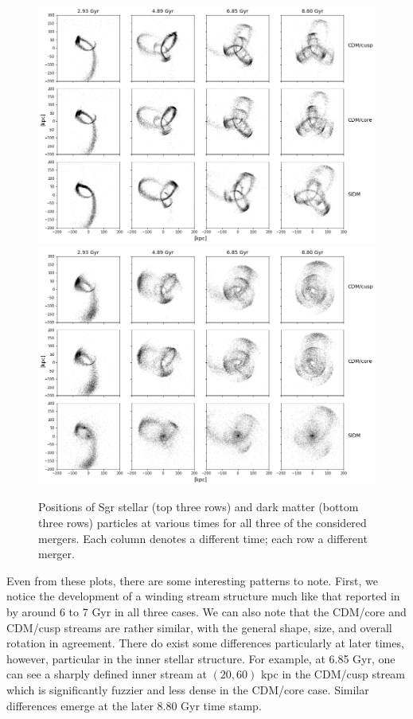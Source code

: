\begin{figure}
    \centering
    \includegraphics[width=0.9\linewidth]{figs/stars_bw.png}
    \includegraphics[width=0.9\linewidth]{figs/darks_bw.png}
    \caption{%
        Positions of Sgr stellar (top three rows) and dark matter (bottom
        three rows) particles at various times for all three of the considered
        mergers.  Each column denotes a different time; each row a different
        merger.
    }
    \label{fig:inits}
\end{figure}

Even from these plots, there are some interesting patterns to note. First, we
notice the development of a winding stream structure much like that reported
in~\cite{dierickx_predicted_2017} by around 6 to 7 Gyr in all three cases. We
can also note that the CDM/core and CDM/cusp streams are rather similar, with
the general shape, size, and overall rotation in agreement. There do exist some
differences particularly at later times, however, particular in the inner
stellar structure.  For example, at 6.85 Gyr, one can see a sharply defined
inner stream at $(20,60)$ kpc in the CDM/cusp stream which is significantly
fuzzier and less dense in the CDM/core case.  Similar differences emerge at
the later 8.80 Gyr time stamp.

